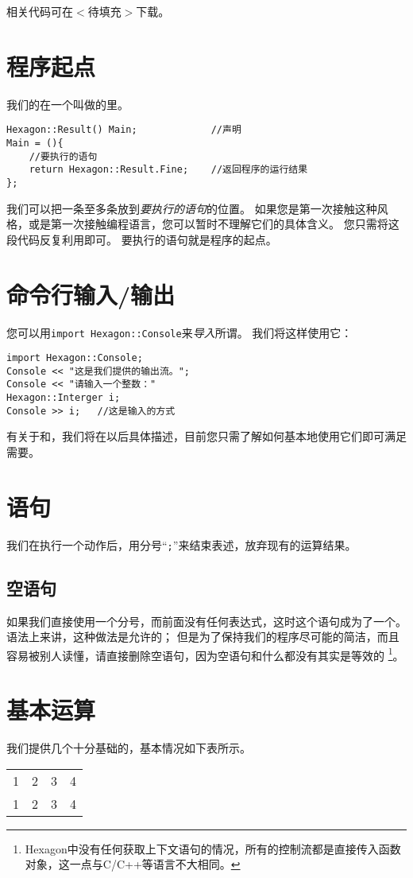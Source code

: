 \documentclass[a4paper]{tufte-book}
\begin{document}
		相关代码可在$<$待填充$>$下载。
		
		\section{程序起点}
			我们的在一个叫做的里。
			\begin{lstlisting}[caption={main函数的标准形式}]
Hexagon::Result() Main; 			//声明
Main = (){
	//要执行的语句
	return Hexagon::Result.Fine;	//返回程序的运行结果
};
			\end{lstlisting}
			我们可以把一条至多条放到\emph{要执行的语句}的位置。
			如果您是第一次接触这种风格，或是第一次接触编程语言，您可以暂时不理解它们的具体含义。
			您只需将这段代码反复利用即可。
			要执行的语句就是程序的起点。
			
		\section{命令行输入/输出}
			您可以用\verb|import Hexagon::Console|来\emph{导入}所谓。
			我们将这样使用它：
			\begin{lstlisting}[caption={输入/输出流}]
import Hexagon::Console;
Console << "这是我们提供的输出流。";
Console << "请输入一个整数："
Hexagon::Interger i;
Console >> i; 	//这是输入的方式
			\end{lstlisting}
			有关于和，我们将在以后具体描述，目前您只需了解如何基本地使用它们即可满足需要。
			
		\section{语句}
			我们在执行一个动作后，用分号“\verb|;|”来结束表述，放弃现有的运算结果。
			\subsection{空语句}
				如果我们直接使用一个分号，而前面没有任何表达式，这时这个语句成为了一个。
				语法上来讲，这种做法是允许的；
				但是为了保持我们的程序尽可能的简洁，而且容易被别人读懂，请直接删除空语句，因为空语句和什么都没有其实是等效的
				\footnote{Hexagon中没有任何获取上下文语句的情况，所有的控制流都是直接传入函数对象，这一点与C/C++等语言不大相同。}。
			
		\section{基本运算}
			我们提供几个十分基础的，基本情况如下表所示。
		\begin{tabular}{|c||c|c|c|}
			\hline
			1 & 2 & 3 & 4 \\
			1 & 2 & 3 & 4
		\end{tabular}
\end{document}
